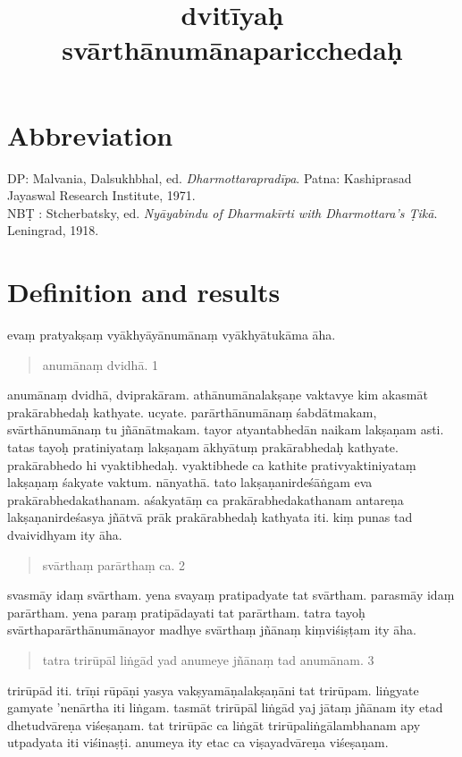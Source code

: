 \documentclass{article}
\title{dvitīyaḥ svārthānumānaparicchedaḥ}
\author{}
\date{}
\begin{document}
\beginnumbering
\maketitle
\section*{Abbreviation}
DP: Malvania, Dalsukhbhal, ed. \textit{Dharmottarapradīpa}. Patna: Kashiprasad Jayaswal Research Institute, 1971.\\
NB\d{T} : Stcherbatsky, ed. \textit{Nyāyabindu of Dharmakīrti with Dharmottara's Ṭikā}. Leningrad, 1918.
\baselineskip
\section{Definition and results}
\pstart
{}evaṃ pratyakṣaṃ vyākhyāyānumānaṃ vyākhyātukāma āha. 
\pend
\pstart
 \begin{quote}
 anumānaṃ dvidhā. 1 
 \end{quote}
 \pend
 \pstart 
anumānaṃ dvidhā, dviprakāram. athānumānalakṣaṇe vaktavye kim akasmāt prakārabhedaḥ kathyate. ucyate. parārthānumānaṃ śabdātmakam, svārthānumānaṃ tu jñānātmakam. tayor atyantabhedān naikam lakṣaṇam asti. tatas tayoḥ pratiniyataṃ lakṣaṇam ākhyātuṃ prakārabhedaḥ kathyate. prakārabhedo hi vyaktibhedaḥ. vyaktibhede ca kathite prativyaktiniyataṃ lakṣaṇaṃ śakyate vaktum. nānyathā. tato lakṣaṇanirdeśāṅgam eva prakārabhedakathanam. aśakyatāṃ ca prakārabhedakathanam antareṇa lakṣaṇanirdeśasya jñātvā prāk prakārabhedaḥ kathyata iti.
\pend
\pstart
{}kiṃ punas tad dvaividhyam ity āha. 
\pend
\pstart
\begin{quote}
svārthaṃ parārthaṃ ca. 2
\end{quote}
\pend
\pstart
svasmāy idaṃ svārtham. yena svayaṃ pratipadyate tat svārtham. parasmāy idaṃ parārtham. yena paraṃ pratipādayati tat parārtham.
\pend
\pstart
tatra tayoḥ svārthaparārthānumānayor madhye svārthaṃ jñānaṃ kiṃviśiṣṭam ity āha. 
\pend
\pstart
\begin{quote}
tatra trirūpāl liṅgād yad anumeye jñānaṃ tad anumānam. 3
\end{quote}
\pend
\pstart
trirūpād iti. trīṇi rūpāṇi yasya vakṣyamāṇalakṣaṇāni tat trirūpam. liṅgyate gamyate 'nenārtha iti liṅgam. tasmāt trirūpāl liṅgād yaj jātaṃ jñānam ity etad dhetudvāreṇa viśeṣaṇam. tat trirūpāc ca liṅgāt trirūpaliṅgālambhanam apy utpadyata iti viśinaṣṭi. anumeya ity etac ca viṣayadvāreṇa viśeṣaṇam.
\pend
\end{document}

